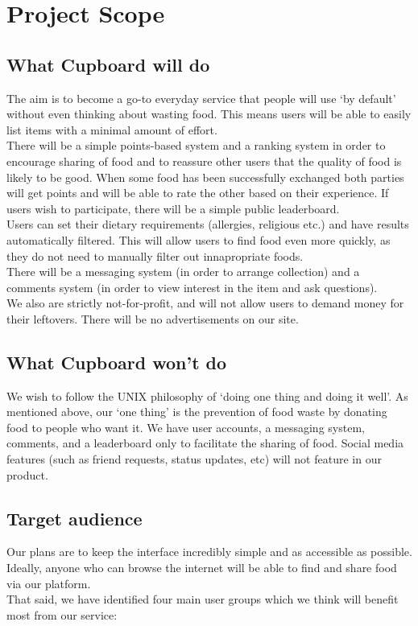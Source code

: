 \documentclass[12pt]{article}
\begin{document}
\section{Project Scope}
\subsection{What Cupboard will do}
The aim is to become a go-to everyday service that people will use `by default'
without even thinking about wasting food. This means users will be able to
easily list items with a minimal amount of effort.\\
There will be a simple points-based system and a ranking system in order to
encourage sharing of food and to reassure other users that the quality of food is
likely to be good. When some food has been successfully exchanged both
parties will get points and will be able to rate the other based on their experience. If users wish to
participate, there will be a simple public leaderboard.\\
Users can set their dietary requirements (allergies, religious etc.) and have
results automatically filtered. This will allow users to find food even more quickly, as they do not need to manually filter out innapropriate foods.\\
There will be a messaging system (in order to arrange collection) and a comments
system (in order to view interest in the item and ask questions). \\
We also are strictly not-for-profit, and will not allow users to demand money for their leftovers. There will be no
advertisements on our site.

\subsection{What Cupboard won't do}
We wish to follow the UNIX philosophy of `doing one thing and doing it well'. As mentioned above,
our `one thing' is the prevention of food waste by donating food to people who want it.
We have user accounts, a messaging system, comments, and a leaderboard only to facilitate the sharing of food.
Social media features (such as friend requests, status updates, etc) will not feature in our product.

\subsection{Target audience}
Our plans are to keep the interface incredibly simple and as accessible as possible. 
Ideally, anyone who can browse the internet will be able to find and share food via our platform.\\
That said, we have identified four main user groups which we think will benefit most from our service:
\end{document}
